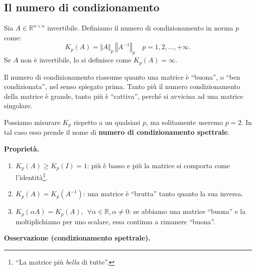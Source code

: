 \subsection{Il numero di condizionamento}
\spazioSecBox
\begin{definition}
Sia $\displaystyle A\in \mathbb{R}^{n\times n}$ invertibile. Definiamo il numero di condizionamento in norma $\displaystyle p$ come:
\begin{equation*}
K_{p}(A) =\Vert A\Vert _{p} \ \left\Vert A^{-1}\right\Vert _{p} \quad p=1,2,\dotsc ,+\infty.
\end{equation*}
Se $\displaystyle A$ non è invertibile, lo si definisce come $K_{p}(A) =  \infty$.
\end{definition}
Il numero di condizionamento riassume quanto una matrice è ``buona'', o ``ben condizionata'', nel senso spiegato prima.
Tanto più il numero condizionamento della matrice è grande, tanto più è ``cattiva'', perché si avvicina ad una matrice singolare.

Possiamo misurare $K_p$ rispetto a un qualsiasi $p$, ma solitamente useremo $p=2$.
In tal caso esso prende il nome di \textbf{numero di condizionamento spettrale}.

\textbf{Proprietà.}
\begin{enumerate}
\item $\displaystyle K_{p}(A) \geqslant K_{p}(I) =1$: più è basso e più la matrice si comporta come l'identità\footnote{``La matrice più \textit{bella} di tutte''.}.
\item $\displaystyle K_{p}(A) =K_{p}\left( A^{-1}\right)$: una matrice è ``brutta'' tanto quanto la sua inversa.
\item $\displaystyle K_{p}( \alpha A) =K_{p}(A) ,\ \ \forall \alpha \in \mathbb{R} ,\alpha \neq 0$: se abbiamo una matrice ``buona'' e la moltiplichiamo per uno scalare, essa continua a rimanere ``buona''.
\end{enumerate}

\textbf{Osservazione (condizionamento spettrale).}


